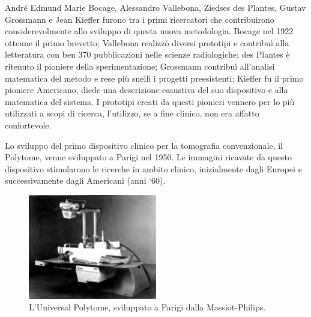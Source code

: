 \documentclass[a4paper,11pt, oneside]{article}
\begin{document}
                \par
                    André Edmund Marie Bocage, Alessandro Vallebona, Ziedses des Plantes, Gustav Grossmann e Jean Kieffer furono tra i primi ricercatori che contribuirono considerevolmente allo sviluppo di questa nuova metodologia. Bocage nel 1922 ottenne il primo brevetto; Vallebona realizzò diversi prototipi e contribuì alla letteratura con ben 370 pubblicazioni nelle scienze radiologiche\cite{vallebona-ricordo}; des Plantes è ritenuto il pioniere della sperimentazione; Grossmann contribuì all’analisi matematica del metodo e rese più snelli i progetti preesistenti; Kieffer fu il primo pioniere Americano, diede una descrizione esaustiva del suo dispositivo e alla matematica del sistema. I prototipi creati da questi pionieri vennero per lo più utilizzati a scopi di ricerca, l'utilizzo, se a fine clinico, non era affatto confortevole.
    
                \par
                    Lo sviluppo del primo dispositivo clinico per la tomografia convenzionale, il Polytome, venne sviluppato a Parigi nel 1950. Le immagini ricavate da questo dispositivo stimolarono le ricerche in ambito clinico, inizialmente dagli Europei e successivamente dagli Americani (anni ‘60).
                            
                    \begin{figure}[h]
                        \centering
                        \includegraphics[width=0.5\textwidth]{polytome}
                        \caption{L'Universal Polytome, sviluppato a Parigi dalla Massiot-Philips.}
                        \label{fig:polytome}
                    \end{figure}
                        
\end{document}
